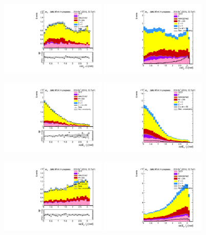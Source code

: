 \begin{figure}[htp]
	\includegraphics[width=0.45\textwidth]{plots/et/DeltaPhiL2Z_CR.pdf}
	\includegraphics[width=0.45\textwidth]{plots/et/DeltaPhiL2Z_withsignal.pdf}

	\includegraphics[width=0.45\textwidth]{plots/et/DeltaPhiMetL1_CR.pdf}
	\includegraphics[width=0.45\textwidth]{plots/et/DeltaPhiMetL1_withsignal.pdf}

	\includegraphics[width=0.45\textwidth]{plots/et/DeltaPhiMetL2_CR.pdf}
	\includegraphics[width=0.45\textwidth]{plots/et/DeltaPhiMetL2_withsignal.pdf}
\end{figure}


